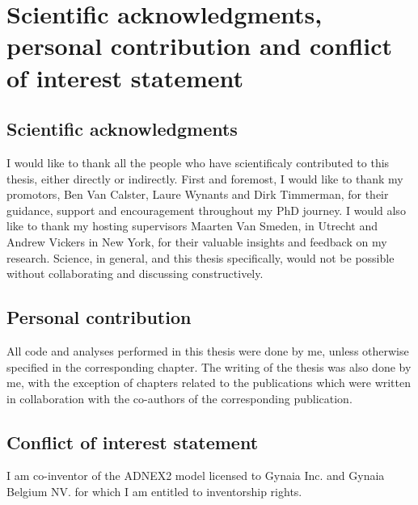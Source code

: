 \chapter*{Scientific acknowledgments, personal contribution and conflict of interest statement}

\section*{Scientific acknowledgments}

I would like to thank all the people who have scientificaly contributed to this thesis, either directly or indirectly. First and foremost, I would like to thank my promotors, Ben Van Calster, Laure Wynants and Dirk Timmerman, for their guidance, support and encouragement throughout my PhD journey. I would also like to thank my hosting supervisors Maarten Van Smeden, in Utrecht and Andrew Vickers in New York, for their valuable insights and feedback on my research. Science, in general, and this thesis specifically, would not be possible without collaborating and discussing constructively. 

\section*{Personal contribution}

All code and analyses performed in this thesis were done by me, unless otherwise specified in the corresponding chapter. The writing of the thesis was also done by me, with the exception of chapters related to the publications which were written in collaboration with the co-authors of the corresponding publication. 

\section*{Conflict of interest statement}

I am co-inventor of the ADNEX2 model licensed to Gynaia Inc. and Gynaia Belgium NV. for which I am entitled to inventorship rights. 